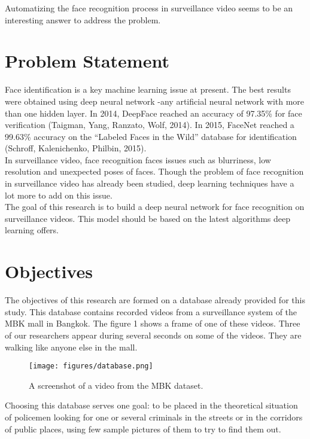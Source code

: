 Automatizing the face recognition process in surveillance video seems to be an interesting answer to address the problem.\\


\section{Problem Statement}

 Face identification is a key machine learning issue at present. The best results were obtained using deep neural network -any artificial neural network with more than one hidden layer. In 2014, DeepFace reached an accuracy of 97.35\% for face verification (Taigman, Yang, Ranzato, Wolf, 2014). In 2015, FaceNet reached a 99.63\% accuracy on the \enquote{Labeled Faces in the Wild} database for identification (Schroff, Kalenichenko, Philbin, 2015).\\


In surveillance video, face recognition faces issues such as blurriness, low resolution and unexpected poses of faces. Though the problem of face recognition in surveillance video has already been studied, deep learning techniques have a lot more to add on this issue.\\

The goal of this research is to build a deep neural network for face recognition on surveillance videos. This model should be based on the latest algorithms deep learning offers.

\section{Objectives}

The objectives of this research are formed on a database already provided for this study. This database contains recorded videos from a surveillance system of the MBK mall in Bangkok. The figure 1 shows a frame of one of these videos. Three of our researchers appear during several seconds on some of the videos. They are walking like anyone else in the mall.\\

\begin{figure}[t]
  \centering
  \texttt{[image: figures/database.png]}  
  \caption[A screenshot of a video from the MBK dataset.]{A screenshot of a video from the MBK dataset.}
  \label{fig:example}
\end{figure}

Choosing this database serves one goal: to be placed in the theoretical situation of policemen looking for one or several criminals in the streets or in the corridors of public places, using few sample pictures of them to try to find them out.\\

